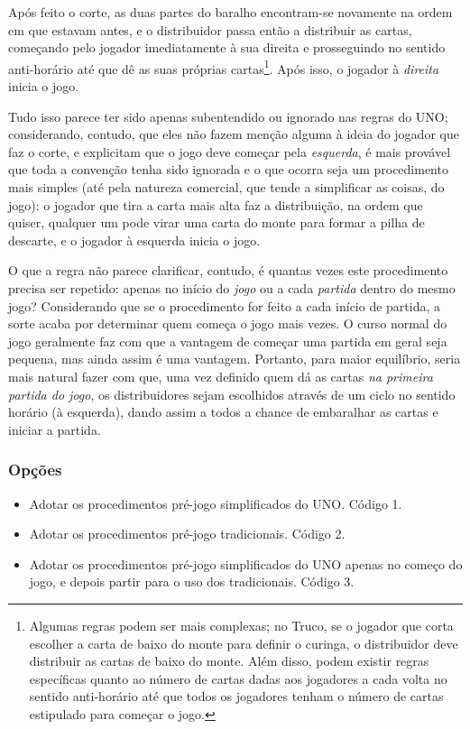 Após feito o corte, as duas partes do baralho encontram-se novamente na ordem em que estavam antes, e o distribuidor passa então a distribuir as cartas, começando pelo jogador imediatamente à sua direita e prosseguindo no sentido anti-horário até que dê as suas próprias cartas\footnote{Algumas regras podem ser mais complexas; no Truco, se o jogador que corta escolher a carta de baixo do monte para definir o curinga, o distribuidor deve distribuir as cartas de baixo do monte. Além disso, podem existir regras específicas quanto ao número de cartas dadas aos jogadores a cada volta no sentido anti-horário até que todos os jogadores tenham o número de cartas estipulado para começar o jogo.}. Após isso, o jogador à \textit{direita} inicia o jogo.

Tudo isso parece ter sido apenas subentendido ou ignorado nas regras do UNO; considerando, contudo, que eles não fazem menção alguma à ideia do jogador que faz o corte, e explicitam que o jogo deve começar pela \textit{esquerda}, é mais provável que toda a convenção tenha sido ignorada e o que ocorra seja um procedimento mais simples (até pela natureza comercial, que tende a simplificar as coisas, do jogo): o jogador que tira a carta mais alta faz a distribuição, na ordem que quiser, qualquer um pode virar uma carta do monte para formar a pilha de descarte, e o jogador à esquerda inicia o jogo.

O que a regra não parece clarificar, contudo, é quantas vezes este procedimento precisa ser repetido: apenas no início do \textit{jogo} ou a cada \textit{partida} dentro do mesmo jogo? Considerando que se o procedimento for feito a cada início de partida, a sorte acaba por determinar quem começa o jogo mais vezes. O curso normal do jogo geralmente faz com que a vantagem de começar uma partida em geral seja pequena, mas ainda assim é uma vantagem. Portanto, para maior equilíbrio, seria mais natural fazer com que, uma vez definido quem dá as cartas \textit{na primeira partida do jogo}, os distribuidores sejam escolhidos através de um ciclo no sentido horário (à esquerda), dando assim a todos a chance de embaralhar as cartas e iniciar a partida.

\subsubsection{Opções}

\begin{itemize}
\item{Adotar os procedimentos pré-jogo simplificados do UNO. Código 1.}
\item{Adotar os procedimentos pré-jogo tradicionais. Código 2.}
\item{Adotar os procedimentos pré-jogo simplificados do UNO apenas no começo do jogo, e depois partir para o uso dos tradicionais. Código 3.}
\end{itemize}

